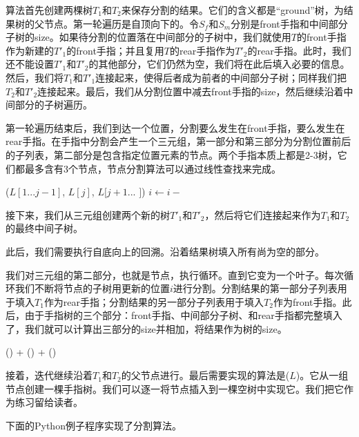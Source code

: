 \documentclass[b5paper]{ctexart}
\begin{document}
算法首先创建两棵树$T_1$和$T_2$来保存分割的结果。它们的含义都是“ground”树，为结果树的父节点。第一轮遍历是自顶向下的。令$S_f$和$S_m$分别是front手指和中间部分子树的size。如果待分割的位置落在中间部分的子树中，我们就使用$T$的front手指作为新建的$T'_1$的front手指；并且复用$T$的rear手指作为$T'_2$的rear手指。此时，我们还不能设置$T'_1$和$T'_2$的其他部分，它们仍然为空，我们将在此后填入必要的信息。然后，我们将$T_1$和$T'_1$连接起来，使得后者成为前者的中间部分子树；同样我们把$T_2$和$T'_2$连接起来。最后，我们从分割位置中减去front手指的size，然后继续沿着中间部分的子树遍历。

第一轮遍历结束后，我们到达一个位置，分割要么发生在front手指，要么发生在rear手指。在手指中分割会产生一个三元组，第一部分和第三部分为分割位置前后的子列表，第二部分是包含指定位置元素的节点。两个手指本质上都是2-3树，它们都最多含有3个节点，节点分割算法可以通过线性查找来完成。

\begin{algorithmic}
      \State \Return ($L[1...j-1]$, $L[j]$, $L[j+1...$  $]$)
    \EndIf
    \State $i \gets i -$ 
  \EndFor
\EndFunction
\end{algorithmic}

接下来，我们从三元组创建两个新的树$T'_1$和$T'_2$，然后将它们连接起来作为$T_1$和$T_2$的最终中间子树。

此后，我们需要执行自底向上的回溯。沿着结果树填入所有尚为空的部分。

我们对三元组的第二部分，也就是节点，执行循环。直到它变为一个叶子。每次循环我们不断将节点的子树用更新的位置$i$进行分割。分割结果的第一部分子列表用于填入$T_1$作为rear手指；分割结果的另一部分子列表用于填入$T_2$作为front手指。此后，由于手指树的三个部分：front手指、中间部分子树、和rear手指都完整填入了，我们就可以计算出三部分的size并相加，将结果作为树的size。

\begin{algorithmic}
  \State \Return {}() + () + ()
\EndFunction
\end{algorithmic}

接着，迭代继续沿着$T_1$和$T_2$的父节点进行。最后需要实现的算法是($L$)。它从一组节点创建一棵手指树。我们可以逐一将节点插入到一棵空树中实现它。我们把它作为练习留给读者。

下面的Python例子程序实现了分割算法。
\end{document}
